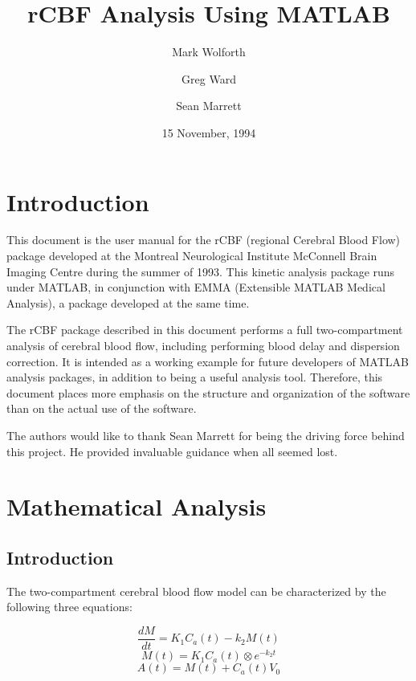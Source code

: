 \documentclass[12pt]{article}
\title{rCBF Analysis Using MATLAB}
\author{Mark Wolforth \and Greg Ward \and Sean Marrett}
\date{15 November, 1994}
\begin{document}
\maketitle

\tableofcontents

\newpage
\section{Introduction}

This document is the user manual for the rCBF (regional Cerebral
Blood Flow) package developed at the Montreal Neurological Institute
McConnell Brain Imaging Centre during the summer of 1993.  This
kinetic analysis package runs under MATLAB, in conjunction with EMMA
(Extensible MATLAB Medical Analysis), a package developed at the same
time.

The rCBF package described in this document performs a full
two-compartment analysis of cerebral blood flow, including performing
blood delay and dispersion correction.  It is intended as a working
example for future developers of MATLAB analysis packages, in
addition to being a useful analysis tool.  Therefore, this document
places more emphasis on the structure and organization of the
software than on the actual use of the software.

The authors would like to thank Sean Marrett for being the driving
force behind this project.  He provided invaluable guidance when all
seemed lost.

\newpage
\section{Mathematical Analysis}

\subsection{Introduction}

The two-compartment cerebral blood flow model can be characterized by
the following three equations:

\begin{equation}
\frac{dM}{dt} = K_{1}C_{a}(t) - k_{2}M(t)      \label{eq:2comp1}
\end{equation}
\begin{equation}
M(t) = K_{1}C_{a}(t) \otimes e^{-k_{2}t}       \label{eq:2comp2}
\end{equation}
\begin{equation}
A(t) = M(t) + C_{a}(t)V_{0}                    \label{eq:2comp3}
\end{equation}
\end{document}
